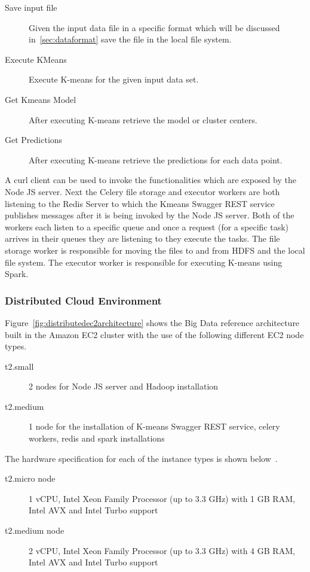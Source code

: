 \begin{description}
	\item[Save input file] Given the input data file in a specific format which 
	will be discussed in~\ref{sec:dataformat} save the file in the local file 
	system.
	\item[Execute KMeans] Execute K-means for the given input data set.
	\item[Get Kmeans Model] After executing K-means retrieve the model or 
	cluster centers.
	\item[Get Predictions] After executing K-means retrieve the predictions for 
	each data point.
\end{description}

A curl client can be used to invoke the functionalities which are exposed by 
the Node JS server. Next the Celery file storage and executor workers are both 
listening to the Redis Server to which the Kmeans Swagger REST service 
publishes messages after it is being invoked by the Node JS server. Both of 
the workers each listen to a specific queue and once a request (for a specific 
task) arrives in their queues they are listening to they execute the tasks. 
The file storage worker is responsible for moving the files to and from HDFS 
and the local file system. The executor worker is responsible for executing 
K-means using Spark.

\subsubsection{Distributed Cloud Environment}
\label{subsubsec:distributedcloud}

Figure~\ref{fig:distributedec2architecture} shows the Big Data reference 
architecture built in the Amazon EC2 cluster with the use of the following 
different EC2 node types.

\begin{description}
	\item[t2.small] 2 nodes for Node JS server and Hadoop installation
	\item[t2.medium] 1 node for the installation of K-means Swagger REST 
	service, celery workers, redis and spark installations
\end{description}

The hardware specification for each of the instance types is shown 
below~\cite{hid-sp18-416-www-amazon-instance-types}.

\begin{description}
	\item[t2.micro node] 1 vCPU, Intel Xeon Family Processor (up to 3.3 GHz) 
	with 1 GB RAM, Intel AVX and Intel Turbo support
	\item[t2.medium node] 2 vCPU, Intel Xeon Family Processor (up to 3.3 GHz) 
	with 4 GB RAM, Intel AVX and Intel Turbo support
\end{description}

